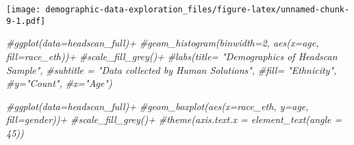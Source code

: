 \documentclass[
]{article}
\newenvironment{Shaded}{\begin{snugshade}}{\end{snugshade}}
\newcommand{\CommentTok}[1]{\textcolor[rgb]{0.56,0.35,0.01}{\textit{#1}}}
\begin{document}
\texttt{[image: demographic-data-exploration\_files/figure-latex/unnamed-chunk-9-1.pdf]}

\begin{Shaded}
\begin{Highlighting}[]
\CommentTok{\#ggplot(data=headscan\_full)+}
  \CommentTok{\#geom\_histogram(binwidth=2, aes(x=age, fill=race\_eth))+}
  \CommentTok{\#scale\_fill\_grey()+}
  \CommentTok{\#labs(title= "Demographics of Headscan Sample",}
       \CommentTok{\#subtitle = "Data collected by Human Solutions",}
       \CommentTok{\#fill= "Ethnicity",}
       \CommentTok{\#y="Count",}
       \CommentTok{\#x="Age")}
\end{Highlighting}
\end{Shaded}

\begin{Shaded}
\begin{Highlighting}[]
\CommentTok{\#ggplot(data=headscan\_full)+}
  \CommentTok{\#geom\_boxplot(aes(x=race\_eth, y=age, fill=gender))+}
  \CommentTok{\#scale\_fill\_grey()+}
  \CommentTok{\#theme(axis.text.x = element\_text(angle = 45))}
\end{Highlighting}
\end{Shaded}
\end{document}
